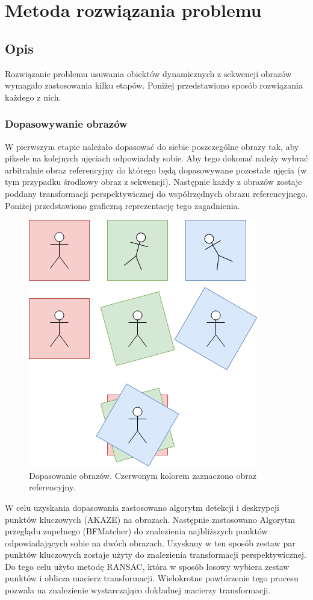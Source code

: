 \chapter{Metoda rozwiązania problemu}\label{algo}
\section{Opis}
Rozwiązanie problemu usuwania obiektów dynamicznych z sekwencji obrazów wymagało zastosowania kilku etapów. Poniżej przedstawiono sposób rozwiązania każdego z nich.

\subsection{Dopasowywanie obrazów}
W pierwszym etapie należało dopasować do siebie poszczególne obrazy tak, aby piksele na kolejnych ujęciach odpowiadały sobie. Aby tego dokonać należy wybrać arbitralnie obraz referencyjny do którego będą dopasowywane pozostałe ujęcia (w tym przypadku środkowy obraz z sekwencji). Następnie każdy z obrazów zostaje poddany transformacji perspektywicznej do współrzędnych obrazu referencyjnego. Poniżej przedstawiono graficzną reprezentację tego zagadnienia.

\begin{figure}[H]
	\centering
		\includegraphics[width=0.5\linewidth]{img/matching.png}
	\caption[Dopasowanie obrazów.]{Dopasowanie obrazów. Czerwonym kolorem zaznaczono obraz referencyjny.}
	\label{fig:binary}
\end{figure}

W celu uzyskania dopasowania zastosowano algorytm detekcji i deskrypcji punktów kluczowych (AKAZE) na obrazach. Następnie zastosowano Algorytm przeglądu zupełnego (BFMatcher) do znalezienia najbliższych punktów odpowiadających sobie na dwóch obrazach. Uzyskany w ten sposób zestaw par punktów kluczowych zostaje użyty do znalezienia transformacji perspektywicznej. Do tego celu użyto metodę RANSAC, która w sposób losowy wybiera zestaw punktów i oblicza macierz transformacji. Wielokrotne powtórzenie tego procesu pozwala na znalezienie wystarczająco dokładnej macierzy transformacji.

